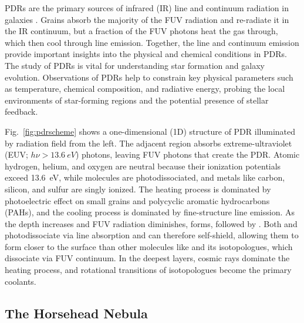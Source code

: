 \documentclass[12pt,a4paper]{article}
\begin{document}
PDRs are the primary sources of infrared (IR) line and continuum radiation in galaxies \parencite{Crawford1985,Stacey2010}. Grains absorb the majority of the FUV radiation and re-radiate it in the IR continuum, but a fraction of the FUV photons heat the gas through, which then cool through line emission. Together, the line and continuum emission provide important insights into the physical and chemical conditions in PDRs. The study of PDRs is vital for understanding star formation and galaxy evolution. Observations of PDRs help to constrain key physical parameters such as temperature, chemical composition, and radiative energy, probing the local environments of star-forming regions and the potential presence of stellar feedback.

Fig.~\ref{fig:pdrscheme} shows a one-dimensional (1D) structure of PDR illuminated by radiation field from the left. The adjacent  region absorbs extreme-ultraviolet (EUV; $h\nu > \qty{13.6}{eV}$) photons, leaving FUV photons that create the PDR. Atomic hydrogen, helium, and oxygen are neutral because their ionization potentials exceed \qty{13.6}{eV}, while molecules are photodissociated, and metals like carbon, silicon, and sulfur are singly ionized. The heating process is dominated by photoelectric effect on small grains and polycyclic aromatic hydrocarbons (PAHs), and the cooling process is dominated by fine-structure line emission. As the depth increases and FUV radiation diminishes,  forms, followed by . Both  and  photodissociate via line absorption and can therefore self-shield, allowing them to form closer to the surface than other molecules like  and its isotopologues, which dissociate via FUV continuum. In the deepest layers, cosmic rays dominate the heating process, and rotational transitions of  isotopologues become the primary coolants.

\subsection{The Horsehead Nebula}
\end{document}
